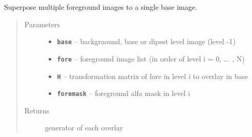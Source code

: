 \documentclass[letterpaper,10pt,english]{sphinxmanual}
\begin{document}
\begin{fulllineitems}
\label{RRtoolbox.lib.arrayops:RRtoolbox.lib.arrayops.basic.multiple_superpose}
Superpose multiple foreground images to a single base image.
\begin{quote}\begin{description}
\item[{Parameters}] \leavevmode\begin{itemize}
\item {} 
\textbf{\texttt{base}} -- backgraound, base or dipest level image (level -1)

\item {} 
\textbf{\texttt{fore}} -- foreground image list (in order of level i = 0, ... , N)

\item {} 
\textbf{\texttt{H}} -- transformation matrix of fore in level i to overlay in base

\item {} 
\textbf{\texttt{foremask}} -- foreground alfa mask in level i

\end{itemize}

\item[{Returns}] \leavevmode
generator of each overlay

\end{description}\end{quote}

\end{fulllineitems}

\end{document}
